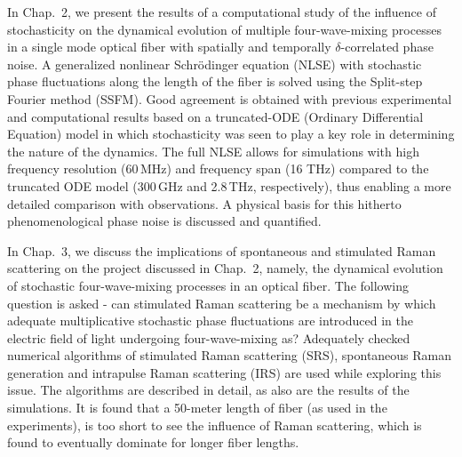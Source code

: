 In Chap.\ 2, we present the results of a computational study of the
influence of stochasticity on the dynamical evolution of multiple
four-wave-mixing processes in a single mode optical fiber with spatially
and temporally $\delta$-correlated phase noise. A generalized nonlinear
Schr\"odinger equation (NLSE) with stochastic phase fluctuations along the
length of the fiber is solved using the Split-step Fourier method
(SSFM). Good agreement is obtained with previous experimental and
computational results based on a truncated-ODE (Ordinary Differential
Equation) model in which stochasticity was seen to play a key role in
determining the nature of the dynamics. The full NLSE allows for
simulations with high frequency resolution (60\,MHz) and frequency span (16
THz) compared to the truncated ODE model (300\,GHz and 2.8\,THz,
respectively), thus enabling a more detailed comparison with
observations. A physical basis for this hitherto phenomenological phase
noise is discussed and quantified.

In Chap.\ 3, we discuss the implications of spontaneous and stimulated
Raman scattering on the project discussed in Chap.\ 2, namely, the dynamical evolution of
stochastic four-wave-mixing processes in an optical fiber.
The following question is asked - can stimulated Raman scattering be a mechanism by which
adequate multiplicative stochastic phase fluctuations are introduced in the
electric field of light undergoing four-wave-mixing as? Adequately checked numerical
algorithms of stimulated Raman scattering (SRS), spontaneous Raman generation and intrapulse
Raman scattering (IRS) are used while exploring this issue. The algorithms are described in detail, as also are
the results of the simulations. It is found that a 50-meter length of fiber (as used in the experiments),
is too short to see the influence of Raman scattering, which is found to eventually
dominate for longer fiber lengths.

